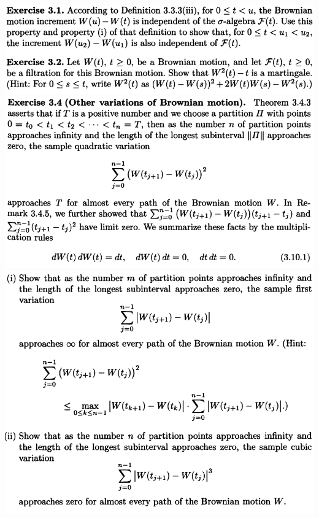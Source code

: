 \documentclass[final,3p,authoryear]{elsarticle}
\begin{document}
	\includegraphics[width=14cm]{Ex3p1a3p2.png}\\
	\includegraphics[width=14cm]{Ex3p4s1.png}\\
	\includegraphics[width=14cm]{Ex3p4s2.png}
\end{document}
